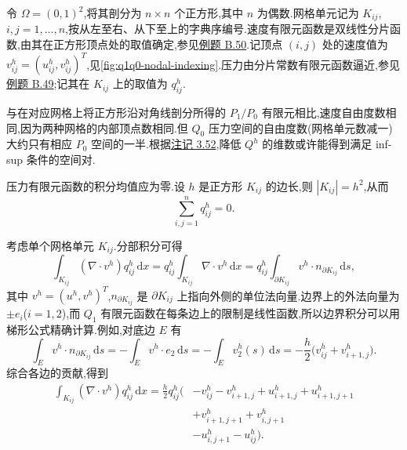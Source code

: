 \begin{example}[($Q_1/Q_0$ 有限元空间对)]\label{ex:q1-q0-instability}
令 $\Omega=(0,1)^2$,将其剖分为 $n\times n$ 个正方形,其中 $n$ 为偶数.网格单元记为 $K_{ij}$,$i,j=1,\ldots,n$,按从左至右、从下至上的字典序编号.速度有限元函数是双线性分片函数,由其在正方形顶点处的取值确定,参见\hyperref[ex:appendix-b-50]{例题 B.50}.记顶点 $(i,j)$ 处的速度值为 $v_{ij}^h=(u_{ij}^h,v_{ij}^h)^T$,见\cref{fig:q1q0-nodal-indexing}.压力由分片常数有限元函数逼近,参见\hyperref[ex:appendix-b-49]{例题 B.49};记其在 $K_{ij}$ 上的取值为 $q_{ij}^h$.

与在对应网格上将正方形沿对角线剖分所得的 $P_1/P_0$ 有限元相比,速度自由度数相同,因为两种网格的内部顶点数相同.但 $Q_0$ 压力空间的自由度数(网格单元数减一)大约只有相应 $P_0$ 空间的一半.根据\hyperref[note:infsup-not-inherited]{注记 3.52},降低 $Q^h$ 的维数或许能得到满足 inf-sup 条件的空间对.

压力有限元函数的积分均值应为零.设 $h$ 是正方形 $K_{ij}$ 的边长,则 $|K_{ij}|=h^2$,从而
\begin{equation}\label{eq:q1q0-pressure-mean}
  \sum_{i,j=1}^{n}q_{ij}^h=0.
\end{equation}

考虑单个网格单元 $K_{ij}$.分部积分可得
\[
  \int_{K_{ij}}(\nabla\cdot v^h)q_{ij}^h\,\mathrm{d}x
   =q_{ij}^h\int_{K_{ij}}\nabla\cdot v^h\,\mathrm{d}x
   =q_{ij}^h\int_{\partial K_{ij}}v^h\cdot n_{\partial K_{ij}}\,\mathrm{d}s,
\]
其中 $v^h=(u^h,v^h)^T$,$n_{\partial K_{ij}}$ 是 $\partial K_{ij}$ 上指向外侧的单位法向量.边界上的外法向量为 $\pm e_i$($i=1,2$),而 $Q_1$ 有限元函数在每条边上的限制是线性函数,所以边界积分可以用梯形公式精确计算.例如,对底边 $E$ 有
\[
  \int_E v^h\cdot n_{\partial K_{ij}}\,\mathrm{d}s
   =-\int_E v^h\cdot e_2\,\mathrm{d}s
   =-\int_E v_2^h(s)\,\mathrm{d}s
   =-\frac{h}{2}\bigl(v_{ij}^h+v_{i+1,j}^h\bigr).
\]
综合各边的贡献,得到
\[
\begin{aligned}
  \int_{K_{ij}}(\nabla\cdot v^h)q_{ij}^h\,\mathrm{d}x
   =\frac{h}{2}q_{ij}^h\bigl(&-v_{ij}^h-v_{i+1,j}^h
       +u_{i+1,j}^h+u_{i+1,j+1}^h\\
       &+v_{i+1,j+1}^h+v_{i,j+1}^h\\
       &-u_{i,j+1}^h-u_{ij}^h\bigr).
\end{aligned}
\]


\end{example}
